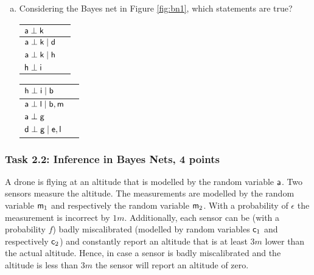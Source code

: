 \documentclass[12pt,a4paper,oneside]{article}
\begin{document}
\begin{enumerate}[a)]
\item Considering the Bayes net in Figure \ref{fig:bn1}, which statements are
  true?

  \vspace{0.2cm}
  \begin{tabular}{|l|l|}
    \hline
    $\rv{a} \perp \rv{k}$ & \hspace{1cm} \\ \hline
    $\rv{a} \perp \rv{k} \; | \; \rv{d}$ & \hspace{1cm} \\ \hline
    $\rv{a} \perp \rv{k} \; | \; \rv{h}$ & \hspace{1cm} \\ \hline
    $\rv{h} \perp \rv{i}$ & \\ \hline
  \end{tabular}
  \hspace{0.2cm}
  \begin{tabular}{|l|l|}
    \hline
    $\rv{h} \perp \rv{i} \; | \; \rv{b}$ & \hspace{1cm} \\ \hline
    $\rv{a} \perp \rv{l} \; | \; \rv{b}, \rv{m}$ & \\ \hline
    $\rv{a} \perp \rv{g}$ & \\ \hline
    $\rv{d} \perp \rv{g} \; | \; \rv{e}, \rv{l}$ & \\ \hline
  \end{tabular}
  \vspace{0.2cm}
\end{enumerate}


%
%
\subsubsection*{Task 2.2: Inference in Bayes Nets, 4 points}

A drone is flying at an altitude that is modelled by the random variable
$\rv{a}$.  Two sensors measure the altitude. The measurements are modelled by
the random variable $\rv{m}_1$ and respectively the random variable $\rv{m}_2$.
With a probability of $\epsilon$ the measurement is incorrect by
$1m$. Additionally, each sensor can be (with a probability $f$) badly
miscalibrated (modelled by random variables $\rv{c}_1$ and respectively
$\rv{c}_2$) and constantly report an altitude that is at least $3m$ lower than
the actual altitude.  Hence, in case a sensor is badly miscalibrated and the
altitude is less than $3m$ the sensor will report an altitude of zero.
\end{document}
